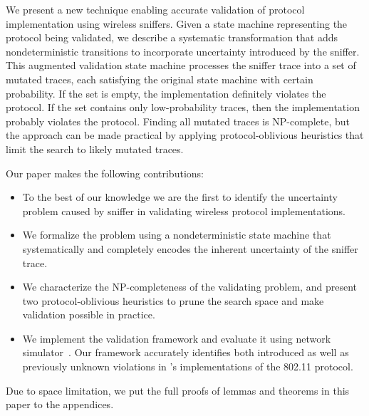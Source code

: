 We present a new technique enabling accurate validation of protocol
implementation using wireless sniffers.
Given a state machine representing the protocol being validated, we describe a
systematic transformation that adds nondeterministic transitions to
incorporate uncertainty introduced by the sniffer.
This augmented validation state machine processes the sniffer trace into a set
of mutated traces, each satisfying the original state machine with certain
probability.
If the set is empty, the implementation definitely violates the protocol.
If the set contains only low-probability traces, then the implementation
probably violates the protocol.
Finding all mutated traces is NP-complete, but the approach can be made
practical by applying protocol-oblivious heuristics that limit the search to
likely mutated traces.

Our paper makes the following contributions:
\begin{itemize}
		  \item To the best of our knowledge we are the first to identify the
    uncertainty problem caused by sniffer in validating wireless protocol
    implementations.
		  \item We formalize the problem using a nondeterministic state machine that
    systematically and completely encodes the inherent uncertainty of the
    sniffer trace.
		    \item We characterize the NP-completeness of the validating problem, and
      present two protocol-oblivious heuristics to prune the search
      space and make validation possible in practice.
			\item We implement the validation framework and evaluate it using
    \ns{} network simulator~\cite{riley2010ns}.
		    Our framework accurately identifies both introduced as well as previously
    unknown violations in \ns{}'s implementations of the 802.11 protocol.
\end{itemize}

Due to space limitation, we put the full proofs of lemmas and theorems in this
paper to the appendices.

\begin{comment}
The rest of this paper is organized as follows.
We motivate the uncertainty problem in Section~\ref{sec:model}.
We then formally describe the problem in Section~\ref{sec:framework},
including the completeness of the augmentation (\S~\ref{subsec:augment}),
hardness analysis (\S~\ref{subsec:hard}) and search algorithms
(\S~\ref{subsec:search}).
We continue by evaluating our framework through two case studies in
Section~\ref{sec:case}.  Finally, we present related works in
Section~\ref{sec:related} and concludes in Section~\ref{sec:conclusion}.
\end{comment}
